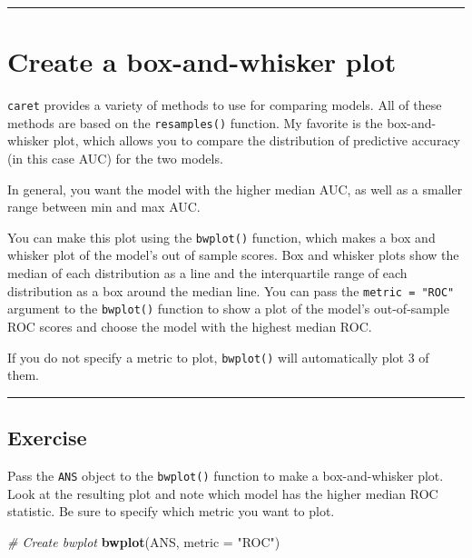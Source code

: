 \documentclass[]{book}
\newenvironment{Shaded}{\begin{snugshade}}{\end{snugshade}}
\newcommand{\KeywordTok}[1]{\textcolor[rgb]{0.13,0.29,0.53}{\textbf{#1}}}
\newcommand{\DataTypeTok}[1]{\textcolor[rgb]{0.13,0.29,0.53}{#1}}
\newcommand{\StringTok}[1]{\textcolor[rgb]{0.31,0.60,0.02}{#1}}
\newcommand{\CommentTok}[1]{\textcolor[rgb]{0.56,0.35,0.01}{\textit{#1}}}
\newcommand{\NormalTok}[1]{#1}
\begin{document}
\begin{center}\rule{0.5\linewidth}{\linethickness}\end{center}

\section{Create a box-and-whisker
plot}\label{create-a-box-and-whisker-plot}

\texttt{caret} provides a variety of methods to use for comparing
models. All of these methods are based on the \texttt{resamples()}
function. My favorite is the box-and-whisker plot, which allows you to
compare the distribution of predictive accuracy (in this case AUC) for
the two models.

In general, you want the model with the higher median AUC, as well as a
smaller range between min and max AUC.

You can make this plot using the \texttt{bwplot()} function, which makes
a box and whisker plot of the model's out of sample scores. Box and
whisker plots show the median of each distribution as a line and the
interquartile range of each distribution as a box around the median
line. You can pass the \texttt{metric\ =\ "ROC"} argument to the
\texttt{bwplot()} function to show a plot of the model's out-of-sample
ROC scores and choose the model with the highest median ROC.

If you do not specify a metric to plot, \texttt{bwplot()} will
automatically plot 3 of them.

\begin{center}\rule{0.5\linewidth}{\linethickness}\end{center}

\subsection*{Exercise}\label{exercise-33}

Pass the \texttt{ANS} object to the \texttt{bwplot()} function to make a
box-and-whisker plot. Look at the resulting plot and note which model
has the higher median ROC statistic. Be sure to specify which metric you
want to plot.

\begin{Shaded}
\begin{Highlighting}[]
\CommentTok{# Create bwplot}
\KeywordTok{bwplot}\NormalTok{(ANS, }\DataTypeTok{metric =} \StringTok{"ROC"}\NormalTok{)}
\end{Highlighting}
\end{Shaded}
\end{document}
